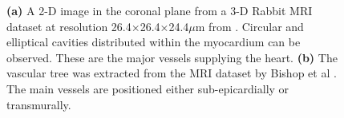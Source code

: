   \begin{figure}[htbp]
		\centering
		\qquad
    \caption{\textbf{(a)} A 2-D image in the coronal plane from a 3-D Rabbit MRI dataset at resolution 26.4×26.4×24.4$\mu$m from \cite{Burton2006}. Circular and elliptical cavities distributed within the myocardium can be observed.  These are the major vessels supplying the heart. \textbf{(b)} The vascular tree was extracted from the MRI dataset by Bishop et al \cite{Bishop2009}. The main vessels are positioned either sub-epicardially or transmurally.}
	  \label{fig:vessels}
	\end{figure}
  
